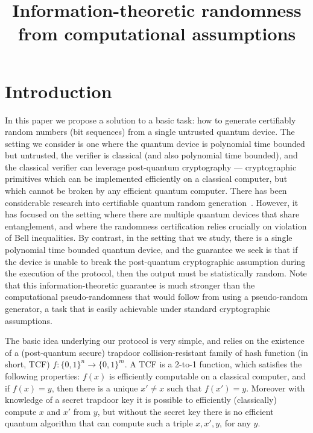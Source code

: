 \documentclass[11pt]{article}
\theoremstyle{remark}
\theoremstyle{definition}
\begin{document}
\title{Information-theoretic randomness from computational assumptions}
\author{}
\date{}
\maketitle

\noteswarning


\section{Introduction}

In this paper we propose a solution to a basic task: how to generate certifiably random numbers (bit sequences) from a single untrusted quantum device. The setting we 
consider is one where the quantum device is polynomial time bounded but untrusted, the verifier is classical (and also polynomial time bounded), and the classical 
verifier can leverage post-quantum cryptography --- cryptographic primitives which can be implemented efficiently on a classical computer, but which cannot be broken
by any efficient quantum computer. 
There has been considerable research into certifiable quantum random generation~\cite{}. However, it has focused on the setting where there are multiple quantum devices
that share entanglement, and where the randomness certification relies crucially on violation of Bell inequalities. By contrast, in the setting that we study, there is a single polynomial 
time bounded quantum device, and the guarantee we seek is that if the device is unable to break the post-quantum cryptographic assumption during the execution of the protocol, then the output 
must be statistically random. Note that this information-theoretic guarantee is much stronger than the computational pseudo-randomness that would follow from using a pseudo-random generator, a task that is easily achievable under standard cryptographic assumptions. 

The basic idea underlying our protocol is very simple, and relies on the existence of a (post-quantum secure) trapdoor collision-resistant family of hash function (in short, TCF) $f:\{0,1\}^n \rightarrow \{0,1\}^m$.
A TCF is a 2-to-1 function, which satisfies the following properties: $f(x)$ is efficiently computable on a classical computer, and if $f(x) = y$, then there is a unique 
$x' \neq x$ such that $ f(x') = y$. Moreover with knowledge of a secret trapdoor key it is possible to efficiently (classically) compute $x$ and $x'$ from $y$, but without the secret key there is no efficient 
quantum algorithm that can compute such a triple $x, x', y$, for any $y$. 
\end{document}
